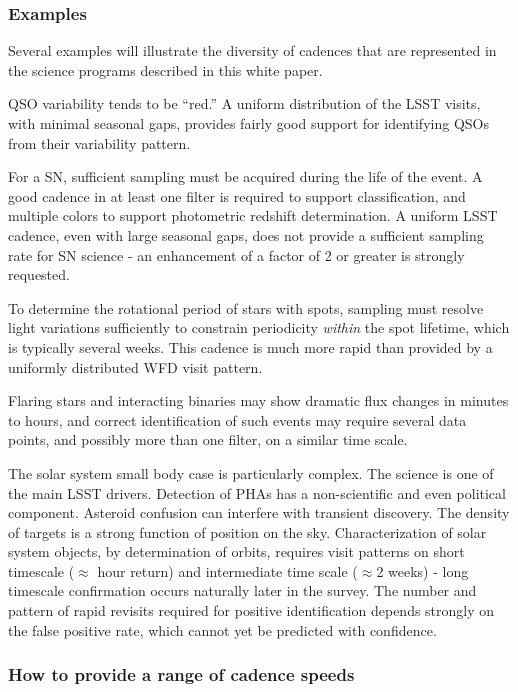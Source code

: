 \subsubsection{Examples}

Several examples will illustrate the diversity of cadences that are
represented in the science programs described in this white paper.

QSO variability tends to be ``red.''   A uniform distribution of the
LSST visits, with minimal seasonal gaps, provides fairly good support
for identifying QSOs from their variability pattern.

For a SN, sufficient sampling must be acquired during the life of the
event. A good cadence in at least one filter is required to support
classification, and multiple colors to support photometric redshift
determination.  A uniform LSST cadence, even with large seasonal gaps,
does not provide a sufficient sampling rate for SN science - an
enhancement of a factor of 2 or greater is strongly requested.

To determine the rotational period of stars with spots, sampling must
resolve light variations sufficiently to constrain periodicity {\it
within} the spot lifetime, which is typically several weeks. This
cadence is much more rapid than provided by a uniformly distributed WFD
visit pattern.

Flaring stars and interacting binaries may show dramatic flux changes
in minutes to hours, and correct identification of such events may
require several data points, and possibly more than one filter, on a
similar time scale.

The solar system small body case is particularly complex.  The science
is one of the main LSST drivers.  Detection of PHAs has a non-scientific
and even political component. Asteroid confusion can interfere with
transient discovery. The density of targets is a strong function of
position on the sky.  Characterization of solar system objects, by
determination of orbits, requires visit patterns on short timescale
($\approx$ hour return) and intermediate time scale ($\approx$2 weeks) -
long timescale confirmation occurs naturally later in the survey.  The
number and pattern of rapid revisits required for positive
identification depends strongly on the false positive rate, which cannot
yet be predicted with confidence.


\subsubsection{How to provide a range of cadence speeds}

